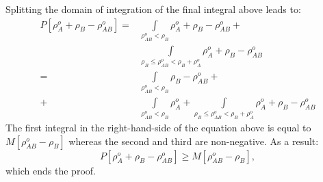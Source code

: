 \documentclass[amsmath,amssymb,preprint,aip,jcp]{revtex4-1}
\begin{document}
Splitting the domain of integration of the final integral above  leads to: 
\begin{align}
P[\rho^{o}_A + \rho_B - \rho_{AB}^o] = & \int\limits_{\rho_{AB}^o < \rho_B}\rho^{o}_A + \rho_B - \rho_{AB}^o + \\ \nonumber
 & \int\limits_{\rho_B \leq \rho_{AB}^o < \rho_B + \rho^{o}_A}\rho^{o}_A + \rho_B - \rho_{AB}^o\nonumber \\
 = & \int\limits_{\rho_{AB}^o < \rho_B} \rho_B - \rho_{AB}^o + \\ \nonumber
 +&\int\limits_{\rho_{AB}^o < \rho_B}\rho^{o}_A + \int\limits_{\rho_B \leq \rho_{AB}^o < \rho_B + \rho^{o}_A}\rho^{o}_A + \rho_B - \rho_{AB}^o\nonumber 
\end{align}
The first integral in the right-hand-side of the equation above is equal to $M[\rho_{AB}^o - \rho_B]$ whereas the second and third are non-negative. As a result:%
\begin{equation}
 P[\rho^{o}_A + \rho_B - \rho_{AB}^o] \geq M[\rho_{AB}^o - \rho_B],
\end{equation}
which ends the proof.
\end{document}
